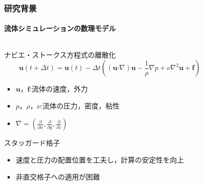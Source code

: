 \documentclass[aspectratio=169,dvipdfmx,hyperref={bookmarks=true}]{beamer}
\begin{document}
  \begin{frame}
  \frametitle{研究背景}
  \framesubtitle{流体シミュレーションの数理モデル}

\begin{columns}[T]
	\begin{column}{0.6\linewidth}
	    \begin{block}{ナビエ・ストークス方程式の離散化}
    	\[
	\bm{u}(t + \varDelta t)  =\bm{u}(t) -\varDelta t( (\bm{u} \boldsymbol{\cdot}\nabla) \bm{u} - \frac{1}{\rho}\nabla p + \nu\nabla^2\bm{u} + \bm{f})
	\]
	\begin{itemize}
	\item $\bm{u}$，$\bm{f}$:流体の速度，外力
	\item $p$，$\rho$，$\nu$:流体の圧力，密度，粘性
	\item $\nabla = ( \frac{\partial}{\partial x}, \frac{\partial}{\partial y}, \frac{\partial}{\partial z})$
\end{itemize}
\end{block}
	\begin{block}{スタッガード格子}
		\begin{itemize}
		\item 速度と圧力の配置位置を工夫し，計算の安定性を向上
		\item 非直交格子への適用が困難
	\end{itemize}
	\end{block}
    	\end{column}
	\begin{column}{0.35\linewidth}

\end{column}
\end{columns}
\end{frame}
\end{document}
